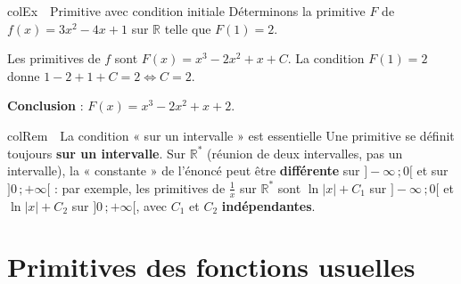 \documentclass[11pt,a4paper]{article}
\newenvironment{exemple}[1][Exemple]
  {\begin{fiche}{colEx}{\ding{217}~~#1}}{\end{fiche}}
\newenvironment{remarque}[1][Remarque]
  {\begin{fiche}{colRem}{\ding{43}~~#1}}{\end{fiche}}
\begin{document}
\begin{exemple}[Primitive avec condition initiale]
Déterminons la primitive $F$ de $f(x)=3x^2-4x+1$ sur $\mathbb{R}$ telle que $F(1)=2$.

\smallskip
Les primitives de $f$ sont $F(x)=x^3-2x^2+x+C$. La condition $F(1)=2$ donne $1-2+1+C=2\iff C=2$.

\smallskip
\textbf{Conclusion} : $F(x)=x^3-2x^2+x+2$.
\end{exemple}

\begin{remarque}[La condition « sur un intervalle » est essentielle]
Une primitive se définit toujours \textbf{sur un intervalle}. Sur $\mathbb{R}^*$ (réunion de deux intervalles, pas un intervalle), la « constante » de l'énoncé peut être \textbf{différente} sur $]-\infty\,;0[$ et sur $]0\,;+\infty[$ : par exemple, les primitives de $\frac1x$ sur $\mathbb{R}^*$ sont $\ln|x|+C_1$ sur $]-\infty\,;0[$ et $\ln|x|+C_2$ sur $]0\,;+\infty[$, avec $C_1$ et $C_2$ \textbf{indépendantes}.
\end{remarque}

\section{Primitives des fonctions usuelles}
\end{document}
